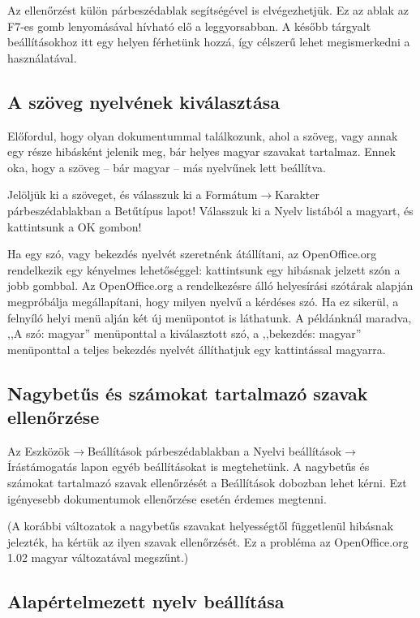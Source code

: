 Az ellenőrzést külön párbeszédablak segítségével is elvégezhetjük.
Ez az ablak az F7-es gomb lenyomásával hívható elő a leggyorsabban.
A később tárgyalt beállításokhoz itt egy helyen férhetünk hozzá,
így célszerű lehet megismerkedni a használatával.

\subsection{A szöveg nyelvének kiválasztása}

Előfordul, hogy olyan dokumentummal találkozunk, ahol a szöveg,
vagy annak egy része hibásként jelenik meg, bár helyes magyar
szavakat tartalmaz. Ennek oka, hogy a szöveg -- bár magyar --
más nyelvűnek lett beállítva.

Jelöljük ki a szöveget, és válasszuk ki a Formátum$\rightarrow$Karakter
párbeszédablakban a Betűtípus lapot! Válasszuk ki a Nyelv
listából a magyart, és kattintsunk a \textsc{OK} gombon!

Ha egy szó, vagy bekezdés nyelvét szeretnénk átállítani,
az OpenOffice.org rendelkezik egy kényelmes lehetőséggel:
kattintsunk egy hibásnak jelzett szón a jobb gombbal. Az OpenOffice.org
a rendelkezésre álló helyesírási szótárak alapján megpróbálja megállapítani,
hogy milyen nyelvű a kérdéses szó. Ha ez sikerül, a felnyíló helyi
menü alján két új menüpontot is láthatunk. A példánknál maradva, ,,A szó: magyar''
menüponttal a kiválasztott szó, a ,,bekezdés: magyar'' menüponttal a teljes bekezdés nyelvét
állíthatjuk egy kattintással magyarra.

\subsection{Nagybetűs és számokat tartalmazó szavak ellenőrzése}

Az Eszközök$\rightarrow$Beállítások párbeszédablakban a
Nyelvi beállítások$\rightarrow$Írástámogatás lapon egyéb
beállításokat is megtehetünk. A nagybetűs és számokat tartalmazó
szavak ellenőrzését a Beállítások dobozban lehet kérni.
Ezt igényesebb dokumentumok ellenőrzése esetén érdemes megtenni.

(A korábbi változatok
a nagybetűs szavakat helyességtől függetlenül hibásnak jelezték,
ha kértük az ilyen szavak ellenőrzését. Ez a probléma
az OpenOffice.org 1.02 magyar változatával megszűnt.)

\subsection{Alapértelmezett nyelv beállítása}

